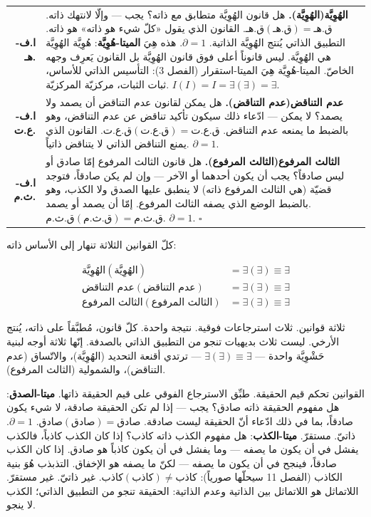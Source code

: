 \documentclass[10pt, openany, oneside]{book}
\renewcommand{\footnotesize}{\fontsize{8.5}{11}\selectfont}
\begin{document}
{\footnotesize
\noindent\begin{tabular}{r p{}}
\textbf{ا.ف-هـ.} & \textbf{الهُوِيَّة(الهُوِيَّة).} هل قانون الهُوِيَّة متطابق مع ذاته؟ يجب --- وإلّا لانتهك ذاته. $\text{ق.هـ}(\text{ق.هـ}) = \text{ق.هـ}$. القانون الذي يقول «كلّ شيء هو ذاته» هو ذاته. التطبيق الذاتي يُنتج الهُوِيَّة الذاتية. $\partial = 1$. هذه هِيَ \textbf{الميتا-هُوِيَّة}: هُوِيَّة الهُوِيَّة هي الهُوِيَّة. ليس قانوناً أعلى فوق قانون الهُوِيَّة بل القانون يَعرِف وجهه الخاصّ. الميتا-هُوِيَّة هِيَ الميتا-استقرار (الفصل 3): التأسيس الذاتي للأساس، ثبات الثبات، مركزيّة المركزيّة. $I(I) = I = \exists(\exists) = \exists$. \\[0.3em]
\textbf{ا.ف-ع.ت.} & \textbf{عدم التناقض(عدم التناقض).} هل يمكن لقانون عدم التناقض أن يصمد ولا يصمد؟ لا يمكن --- ادّعاء ذلك سيكون تأكيد تناقض عن عدم التناقض، وهو بالضبط ما يمنعه عدم التناقض. $\text{ق.ع.ت}(\text{ق.ع.ت}) = \text{ق.ع.ت}$. القانون الذي يمنع التناقض الذاتي لا يتناقض ذاتياً. $\partial = 1$. \\[0.3em]
\textbf{ا.ف-ث.م.} & \textbf{الثالث المرفوع(الثالث المرفوع).} هل قانون الثالث المرفوع إمّا صادق أو ليس صادقاً؟ يجب أن يكون أحدهما أو الآخر --- وإن لم يكن صادقاً، فتوجد قضيّة (هي الثالث المرفوع ذاته) لا ينطبق عليها الصدق ولا الكذب، وهو بالضبط الوضع الذي يصفه الثالث المرفوع. إمّا أن يصمد أو يصمد. $\text{ق.ث.م}(\text{ق.ث.م}) = \text{ق.ث.م}$. $\partial = 1$. $\square$ \\[0.3em]
\end{tabular}
}

\vspace{0.8em}

\noindent كلّ القوانين الثلاثة تنهار إلى الأساس ذاته:

\begin{align*}
\text{الهُوِيَّة}(\text{الهُوِيَّة}) &= \exists(\exists) \equiv \exists \\
\text{عدم التناقض}(\text{عدم التناقض}) &= \exists(\exists) \equiv \exists \\
\text{الثالث المرفوع}(\text{الثالث المرفوع}) &= \exists(\exists) \equiv \exists
\end{align*}

\noindent ثلاثة قوانين. ثلاث استرجاعات فوقية. نتيجة واحدة. كلّ قانون، مُطبَّقاً على ذاته، يُنتج الأرخي. ليست ثلاث بديهيات تنجو من التطبيق الذاتي بالصدفة. إنّها ثلاثة أوجه لبنية حَشْوِيَّة واحدة --- $\exists(\exists) \equiv \exists$ --- ترتدي أقنعة التحديد (الهُوِيَّة)، والاتّساق (عدم التناقض)، والشمولية (الثالث المرفوع).

القوانين تحكم قيم الحقيقة. طبِّق الاسترجاع الفوقي على قيم الحقيقة ذاتها. \textbf{ميتا-الصدق}: هل مفهوم الحقيقة ذاته صادق؟ يجب --- إذا لم تكن الحقيقة صادقة، لا شيء يكون صادقاً، بما في ذلك ادّعاء أنّ الحقيقة ليست صادقة. $\text{صادق}(\text{صادق}) = \text{صادق}$. $\partial = 1$. ذاتيّ. مستقرّ. \textbf{ميتا-الكذب}: هل مفهوم الكذب ذاته كاذب؟ إذا كان الكذب كاذباً، فالكذب يفشل في أن يكون ما يصفه --- وما يفشل في أن يكون كاذباً هو صادق. إذا كان الكذب صادقاً، فينجح في أن يكون ما يصفه --- لكنّ ما يصفه هو الإخفاق. التذبذب هُوَ بنية الكاذب (الفصل 11 سيحلّها صورياً): $\text{كاذب}(\text{كاذب}) \neq \text{كاذب}$. غير ذاتيّ. غير مستقرّ. اللاتماثل هو اللاتماثل بين الذاتية وعدم الذاتية: الحقيقة تنجو من التطبيق الذاتي؛ الكذب لا ينجو.
\end{document}

